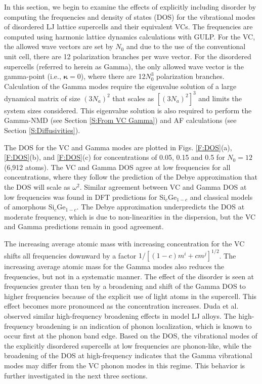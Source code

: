 \documentclass[aps,prb,onecolumn,preprint,footinbib,superscriptaddress,amsmath,amssymb,floatfix]{revtex4}
\begin{document}
In this section, we begin to examine the effects of explicitly including 
disorder by computing the frequencies and density of states (DOS)  
for the vibrational modes of disordered LJ lattice supercells and their 
equivalent VCs. The frequencies 
are computed using harmonic lattice dynamics calculations with  
GULP.\cite{gale_general_2003}  For the 
VC, the allowed wave vectors are set by $N_0$ and due to the use of the 
conventional unit cell, there are 12 
polarization branches per wave vector.  
For the disordered supercells (referred to herein as Gamma),
the only allowed wave vector is the gamma-point (i.e., $\pmb{\kappa}=0$),  
where there are 12$N_0^3$ polarization branches. Calculation of the 
Gamma modes require the eigenvalue solution of a large dynamical matrix of size 
$(3N_a)^2$ that scales as $[(3N_a)^2]^3$ and limits the system 
sizes considered.\cite{gale_general_2003} This eigenvalue solution is also 
required to perform the Gamma-NMD (see Section \ref{S:From VC Gamma})  
and AF calculations (see Section \ref{S:Diffusivities}). 

The DOS for the VC and Gamma modes are plotted in Figs. \ref{F:DOS}(a), 
\ref{F:DOS}(b), and \ref{F:DOS}(c) 
for concentrations of 0.05, 0.15 and 0.5 for 
$N_0=12$ (6,912 atoms). The VC and Gamma DOS 
agree at low frequencies for all concentrations, 
where they follow the prediction of the Debye approximation that 
the DOS will scale as $\omega^2$.\cite{ashcroft_solid_1976} 
Similar agreement between VC and Gamma DOS at low frequencies 
was found in DFT predictions 
for Si$_c$Ge$_{1-c}$\cite{garg_role_2011} and 
classical models of amorphous Si$_c$Ge$_{1-c}$.
\cite{bouchard_vibrational_1988} The Debye approximation 
underpredicts the DOS at moderate frequency, which is due to 
non-linearities in the dispersion,\cite{ashcroft_solid_1976} but the 
VC and Gamma predictions remain in good agreement. 

The increasing average atomic  
mass with increasing concentration for the VC shifts all   
frequencies downward by a factor $1/[(1-c)m^i + cm^j]^{1/2}$. 
The increasing average atomic 
mass for the Gamma modes also reduces the frequencies, but not in a 
systematic manner. 
The effect of the disorder is seen at frequencies greater than 
ten by a broadening and shift of the Gamma DOS to higher frequencies 
because of the explicit use of light atoms in the supercell. This effect 
becomes more pronounced as the concentration increases.  
Duda et al. 
observed similar high-frequency broadening effects in model LJ alloys.
\cite{duda_reducing_2011} The high-frequency broadening is an indication 
of phonon localization, which is known to occur first at the phonon band 
edge.\cite{chu_effect_1989} 
Based on the DOS, the vibrational modes of the explicitly disordered 
supercells at low frequencies are phonon-like, while the broadening 
of the DOS at high-frequency indicates that the Gamma 
vibrational modes may differ from the VC phonon modes in this regime. 
This behavior is further investigated in the next three sections. 
\end{document}
